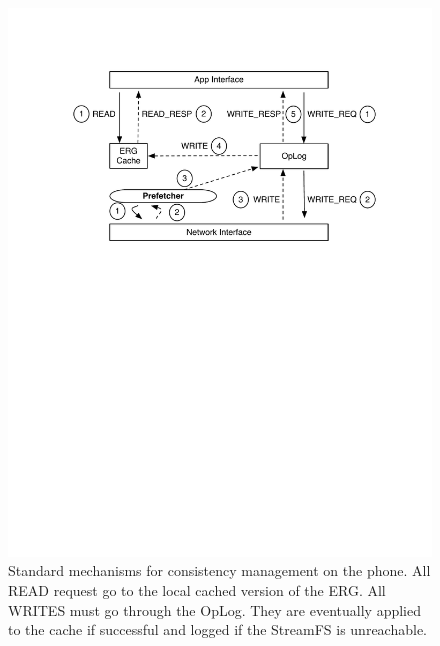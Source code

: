 


\begin{figure}[htb!]
\begin{center}
\includegraphics[scale=0.50]{figs/standard_interaction}
\caption{Standard mechanisms for consistency management on the phone.  All READ request go to the local
cached version of the ERG.  All WRITES must go through the OpLog.  They are eventually applied to the cache
if successful and logged if the StreamFS is unreachable.}
\label{fig:interactions}
\end{center}
\end{figure}

